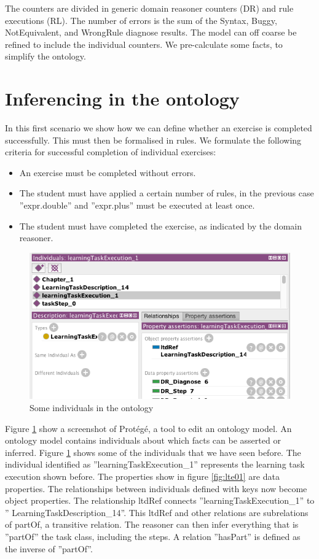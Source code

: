 The counters are divided in generic domain reasoner counters (DR) and rule executions (RL).
The number of errors is the sum of the Syntax, Buggy, NotEquivalent, and WrongRule diagnose results.
The model can off coarse be refined to include the individual counters.
We pre-calculate some facts, to simplify the ontology. 

\section{Inferencing in the ontology}
\label{section:infont}
In this first scenario we show how we can define whether an exercise is completed successfully.
This must then be formalised in rules.
We formulate the following criteria for successful completion of individual exercises:
\begin{itemize}
\item An exercise must be completed without errors. 
\item The student must have applied a certain number of rules, in the previous case ''expr.double'' and ''expr.plus'' must be executed at least once.
\item The student must have completed the exercise, as indicated by the domain reasoner. 
\end{itemize}



\begin{figure}
\includegraphics[scale=0.7]{pictures/screen07.png}
\caption{Some individuals in the ontology}
\label{fig:onto04}
\end{figure}

Figure \ref{fig:onto04} show a screenshot of Prot\'eg\'e, a tool to edit an ontology model.
An ontology model contains individuals about which facts can be asserted or inferred.
Figure \ref{fig:onto04} shows some of the individuals that we have seen before.
The individual identified as  ''learningTaskExecution\_1'' represents the learning task execution shown before.
The properties show in figure \ref{fig:lte01} are data properties.
The relationships between individuals defined with keys now become object properties.
The relationship ltdRef connects ''learningTaskExecution\_1'' to '' LearningTaskDescription\_14''.
This ltdRef and other relations are subrelations of partOf, a transitive relation.
The reasoner can then infer everything that is ''partOf'' the task class, including the steps.
A relation ''hasPart'' is defined as the inverse of ''partOf''.



